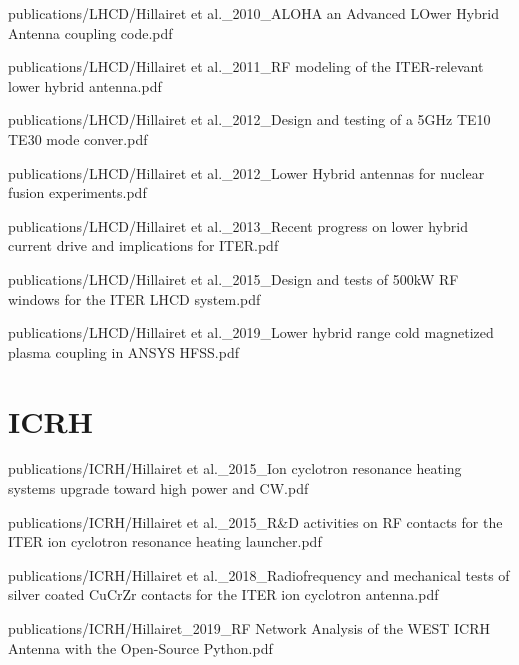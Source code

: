 \documentclass[
fontsize=10pt, %
twoside=true, %
numbers=noenddot, %
]{kaobook}
\begin{document}
		
		{publications/LHCD/Hillairet et al._2010_ALOHA an Advanced LOwer Hybrid Antenna coupling code.pdf}
		
		
		{publications/LHCD/Hillairet et al._2011_RF modeling of the ITER-relevant lower hybrid antenna.pdf}
		
		
		{publications/LHCD/Hillairet et al._2012_Design and testing of a 5GHz TE10 TE30 mode conver.pdf}
		
		
		{publications/LHCD/Hillairet et al._2012_Lower Hybrid antennas for nuclear fusion experiments.pdf}
		
		
		{publications/LHCD/Hillairet et al._2013_Recent progress on lower hybrid current drive and implications for ITER.pdf}
		
		
		{publications/LHCD/Hillairet et al._2015_Design and tests of 500kW RF windows for the ITER LHCD system.pdf}
		
		
		{publications/LHCD/Hillairet et al._2019_Lower hybrid range cold magnetized plasma coupling in ANSYS HFSS.pdf}
		
	\section{ICRH}
	
		
		{publications/ICRH/Hillairet et al._2015_Ion cyclotron resonance heating systems upgrade toward high power and CW.pdf}
		
			
		{publications/ICRH/Hillairet et al._2015_R&D activities on RF contacts for the ITER ion cyclotron resonance heating launcher.pdf}
		
		
		{publications/ICRH/Hillairet et al._2018_Radiofrequency and mechanical tests of silver coated CuCrZr contacts for the ITER ion cyclotron antenna.pdf}
		
		
		{publications/ICRH/Hillairet_2019_RF Network Analysis of the WEST ICRH Antenna with the Open-Source Python.pdf}
	
\end{document}
